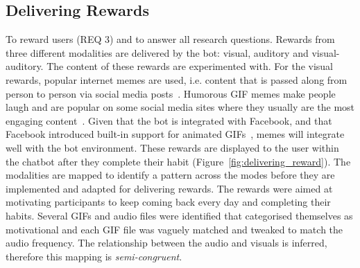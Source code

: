\subsection*{Delivering Rewards}
To reward users (REQ 3) and to answer all research questions. Rewards from three different modalities are delivered by the bot: visual, auditory and visual-auditory. The content of these rewards are experimented with. For the visual rewards, popular internet memes are used, i.e. content that is passed along from person to person via social media posts~\cite{meme_definition}. Humorous GIF memes make people laugh and are popular on some social media sites where they usually are the most engaging content~\cite{meme_gifs_are_good}. Given that the bot is integrated with Facebook, and that Facebook introduced built-in support for animated GIFs~\cite{fb_gif_rollout}, memes will integrate well with the bot environment. These rewards are displayed to the user within the chatbot after they complete their habit (Figure~\ref{fig:delivering_reward}). The modalities are mapped to identify a pattern across the modes before they are implemented and adapted for delivering rewards. The rewards were aimed at motivating participants to keep coming back every day and completing their habits. Several GIFs and audio files were identified that categorised themselves as motivational and each GIF file was vaguely matched and tweaked to match the audio frequency. The relationship between the audio and visuals is inferred, therefore this mapping is \textit{semi-congruent}.


